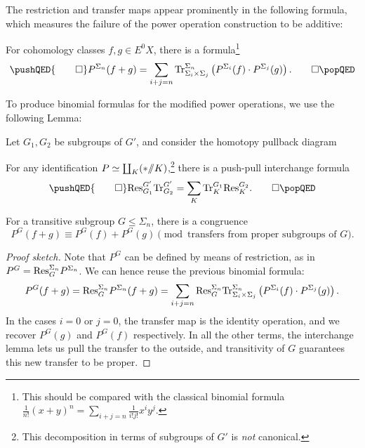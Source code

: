 The restriction and transfer maps appear prominently in the following formula, which measures the failure of the power operation construction to be additive:
\begin{lemma}
For cohomology classes \(f, g \in E^0 X\), there is a formula\footnote{This should be compared with the classical binomial formula \(\frac{1}{n!} (x + y)^n = \sum_{i+j = n} \frac{1}{i!j!} x^i y^j\).}
\[\pushQED{\qed}
P^{\Sigma_n}(f + g) = \sum_{i + j = n} \Tr_{\Sigma_i \times \Sigma_j}^{\Sigma_n}\left(P^{\Sigma_i}(f) \cdot P^{\Sigma_j}(g)\right). \qedhere
\popQED\]
\end{lemma}

\noindent To produce binomial formulas for the modified power operations, we use the following Lemma:

\begin{lemma}
Let \(G_1, G_2\) be subgroups of \(G'\), and consider the homotopy pullback diagram
\begin{center}
\end{center}
For any identification \(P \simeq \coprod_K (* /\!\!/ K)\),\footnote{This decomposition in terms of subgroups of \(G'\) is \emph{not} canonical.} there is a push-pull interchange formula
\[\pushQED{\qed}
\Res_{G_1}^{G'} \Tr_{G_2}^{G'} = \sum_K \Tr^{G_1}_K \Res_K^{G_2}. \qedhere
\popQED\]
\end{lemma}

\begin{corollary}
For a transitive subgroup \(G \le \Sigma_n\), there is a congruence \[P^G(f + g) \equiv P^G(f) + P^G(g) \pmod{\text{transfers from proper subgroups of \(G\)}}.\]
\end{corollary}
\begin{proof}[Proof sketch]
Note that \(P^G\) can be defined by means of restriction, as in \(P^G = \mathrm{Res}^{\Sigma_n}_G P^{\Sigma_n}\).  We can hence reuse the previous binomial formula: \[P^G(f + g) = \mathrm{Res}^{\Sigma_n}_G P^{\Sigma_n}(f + g) = \sum_{i+j = n} \mathrm{Res}^{\Sigma_n}_G \mathrm{Tr}_{\Sigma_i \times \Sigma_j}^{\Sigma_n}\left(P^{\Sigma_i}(f) \cdot P^{\Sigma_j}(g)\right).\]  In the cases \(i = 0\) or \(j = 0\), the transfer map is the identity operation, and we recover \(P^G(g)\) and \(P^G(f)\) respectively.  In all the other terms, the interchange lemma lets us pull the transfer to the outside, and transitivity of \(G\) guarantees this new transfer to be proper.
\end{proof}

